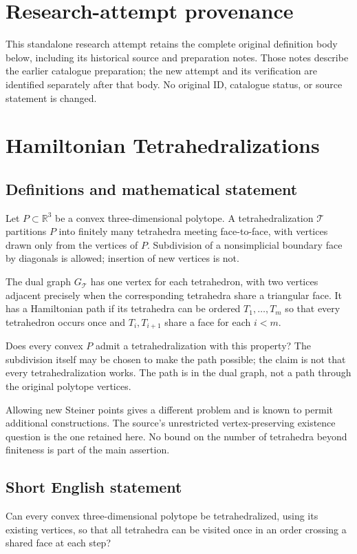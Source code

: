 \documentclass[11pt,a4paper]{article}
\begin{document}
\section*{Research-attempt provenance}
This standalone research attempt retains the complete original definition body below,
including its historical source and preparation notes. Those notes describe the
earlier catalogue preparation; the new attempt and its verification are identified
separately after that body. No original ID, catalogue status, or source statement is changed.

\section*{Hamiltonian Tetrahedralizations}\label{statement}

\subsection{Definitions and mathematical statement}
Let $P\subset\mathbb R^3$ be a convex three-dimensional polytope. A
tetrahedralization $\mathcal T$ partitions $P$ into finitely many
tetrahedra meeting face-to-face, with vertices drawn only from the
vertices of $P$. Subdivision of a nonsimplicial boundary face by
diagonals is allowed; insertion of new vertices is not.

The dual graph $G_{\mathcal T}$ has one vertex for each tetrahedron,
with two vertices adjacent precisely when the corresponding
tetrahedra share a triangular face. It has a Hamiltonian path if its
tetrahedra can be ordered $T_1,\ldots,T_m$ so that every tetrahedron
occurs once and $T_i,T_{i+1}$ share a face for each $i<m$.

Does every convex $P$ admit a tetrahedralization with this property?
The subdivision itself may be chosen to make the path possible;
the claim is not that every tetrahedralization works. The path is
in the dual graph, not a path through the original polytope vertices.

Allowing new Steiner points gives a different problem and is known
to permit additional constructions. The source's unrestricted
vertex-preserving existence question is the one retained here.
No bound on the number of tetrahedra beyond finiteness is part of
the main assertion.
\subsection{Short English statement}
Can every convex three-dimensional polytope be tetrahedralized, using
its existing vertices, so that all tetrahedra can be visited once in
an order crossing a shared face at each step?
\end{document}
